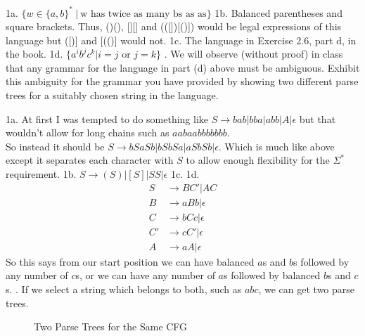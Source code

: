

\usepackage{subfigure}
\usepackage{graphicx}



\homeworkheader{\classnameandsection}

\begin{problem}{1}
  1a. $\{w \in \{a,b\}^*\ |\ \text{w has twice as many bs as as} \}$
  \br
  1b. Balanced parentheses and square brackets. Thus, ()(), [][] and (([])[()]) would be legal expressions of this
     language but ([)] and [(()] would not.
  \br
  1c. The language in Exercise 2.6, part d, in the book.
  \br
  1d. $\{ a^ib^jc^k | i = j \text{ or } j = k \}$
  . We will observe (without proof) in class that any grammar for the language in part (d) above must be ambiguous.
     Exhibit this ambiguity for the grammar you have provided by showing two different parse trees for a suitably chosen
     string in the language.
  \begin{solution}
    1a. At first I was tempted to do something like $S \rightarrow bab | bba | abb | A | \epsilon$ but that wouldn't
    allow for long chains such as $aabaabbbbbbb$. \\ So instead it should be $S \rightarrow bSaSb | bSbSa |
    aSbSb|\epsilon$. Which is much like above except it separates each character with $S$ to allow enough flexibility
    for the $\Sigma^*$ requirement.
    \br
    1b. $S \rightarrow (S)|[S]|SS|\epsilon$
    \br
    1c.
    \br
    1d.
    \begin{align*}
      S &\rightarrow BC'|AC \\
      B &\rightarrow aBb | \epsilon \\
      C &\rightarrow bCc | \epsilon \\
      C' &\rightarrow cC' | \epsilon \\
      A &\rightarrow aA | \epsilon
    \end{align*}
    So this says from our start position we can have balanced $a$s and $b$s followed by any number of $c$s, or we can
    have any number of $a$s followed by balanced $b$s and $c$s.
    . If we select a string which belongs to both, such as $abc$, we can get two parse trees.
    \begin{figure}[H]
      \centering
      \caption{Two Parse Trees for the Same CFG}
\end{figure}
\end{solution}
\end{problem}
